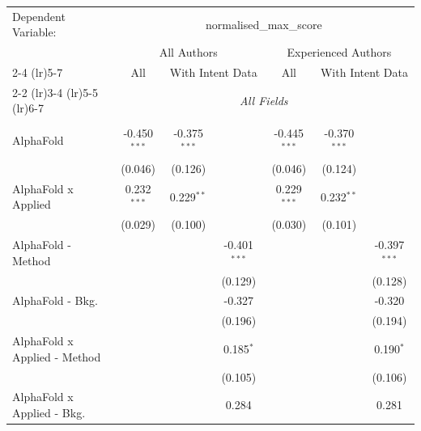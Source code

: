\begingroup
\centering
\begin{tabular}{lcccccc}
   \tabularnewline \midrule \midrule
   Dependent Variable: & \multicolumn{6}{c}{normalised\_max\_score}\\
 & \multicolumn{3}{c}{All Authors} & \multicolumn{3}{c}{Experienced Authors} \\
\cmidrule(lr){2-4} \cmidrule(lr){5-7}
 & \multicolumn{1}{c}{All} & \multicolumn{2}{c}{With Intent Data} & \multicolumn{1}{c}{All} & \multicolumn{2}{c}{With Intent Data} \\
\cmidrule(lr){2-2} \cmidrule(lr){3-4} \cmidrule(lr){5-5} \cmidrule(lr){6-7}
 & \multicolumn{6}{c}{\textit{All Fields}} \\ \\
   AlphaFold                      & -0.450$^{***}$ & -0.375$^{***}$ &                & -0.445$^{***}$ & -0.370$^{***}$ &   \\   
                                  & (0.046)        & (0.126)        &                & (0.046)        & (0.124)        &   \\   
   AlphaFold x Applied            & 0.232$^{***}$  & 0.229$^{**}$   &                & 0.229$^{***}$  & 0.232$^{**}$   &   \\   
                                  & (0.029)        & (0.100)        &                & (0.030)        & (0.101)        &   \\   
   AlphaFold - Method             &                &                & -0.401$^{***}$ &                &                & -0.397$^{***}$\\   
                                  &                &                & (0.129)        &                &                & (0.128)\\   
   AlphaFold - Bkg.               &                &                & -0.327         &                &                & -0.320\\   
                                  &                &                & (0.196)        &                &                & (0.194)\\   
   AlphaFold x Applied - Method   &                &                & 0.185$^{*}$    &                &                & 0.190$^{*}$\\   
                                  &                &                & (0.105)        &                &                & (0.106)\\   
   AlphaFold x Applied - Bkg.     &                &                & 0.284          &                &                & 0.281\\   

\end{tabular}

